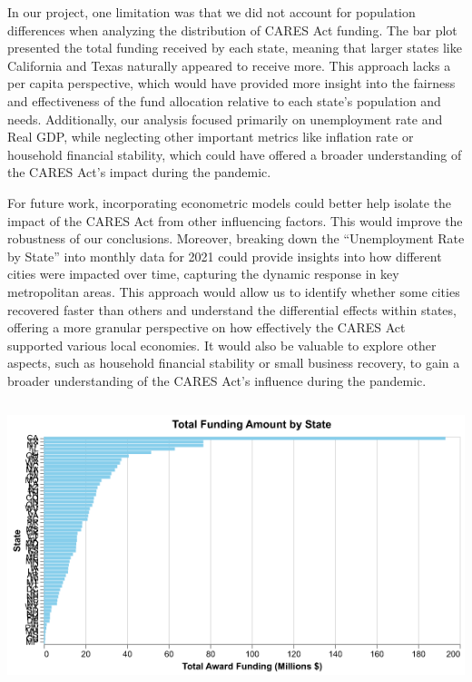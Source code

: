 \documentclass[
]{article}
\begin{document}
In our project, one limitation was that we did not account for
population differences when analyzing the distribution of CARES Act
funding. The bar plot presented the total funding received by each
state, meaning that larger states like California and Texas naturally
appeared to receive more. This approach lacks a per capita perspective,
which would have provided more insight into the fairness and
effectiveness of the fund allocation relative to each state's population
and needs. Additionally, our analysis focused primarily on unemployment
rate and Real GDP, while neglecting other important metrics like
inflation rate or household financial stability, which could have
offered a broader understanding of the CARES Act's impact during the
pandemic.

For future work, incorporating econometric models could better help
isolate the impact of the CARES Act from other influencing factors. This
would improve the robustness of our conclusions. Moreover, breaking down
the ``Unemployment Rate by State'' into monthly data for 2021 could
provide insights into how different cities were impacted over time,
capturing the dynamic response in key metropolitan areas. This approach
would allow us to identify whether some cities recovered faster than
others and understand the differential effects within states, offering a
more granular perspective on how effectively the CARES Act supported
various local economies. It would also be valuable to explore other
aspects, such as household financial stability or small business
recovery, to gain a broader understanding of the CARES Act's influence
during the pandemic.

\includegraphics[width=5.72917in,height=3.26042in]{write_up_files/figure-pdf/cell-5-output-1.png}
\end{document}
